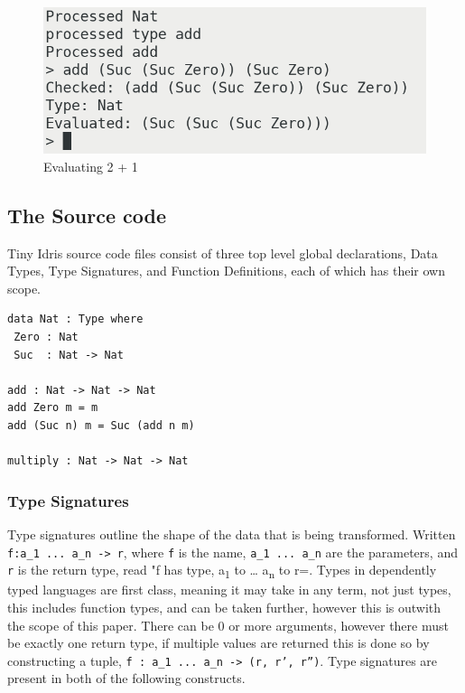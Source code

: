 \documentclass[a4paper]{article}
\begin{document}
\begin{center}
\begin{figure}[htbp]
\centering
\includegraphics[scale=0.35]{./Resource/addEval.png}
\caption{Evaluating 2 + 1}
\end{figure}
\end{center}

\subsection{The Source code}
\label{sec:org61b1be2}
Tiny Idris source code files consist of three top level global 
declarations, Data Types, Type Signatures, and Function Definitions,
each of which has their own scope. 

\begin{center}
\begin{verbatim}
data Nat : Type where
 Zero : Nat
 Suc  : Nat -> Nat

add : Nat -> Nat -> Nat
add Zero m = m
add (Suc n) m = Suc (add n m) 

multiply : Nat -> Nat -> Nat
\end{verbatim}
\end{center}

\subsubsection{Type Signatures}
\label{sec:org63270a0}
Type signatures outline the shape of the data that is being transformed.
Written \texttt{f:a\_1 ... a\_n -> r}, where \texttt{f} is the name, \texttt{a\_1 ...  a\_n} are
the parameters, and \texttt{r} is the return type, read "f has type, a\textsubscript{1} 
to \ldots{} a\textsubscript{n} to r=. Types in dependently typed languages are first class,
meaning it may take in any term, not just types, this includes function
types, and can be taken further, however this is outwith the scope of
this paper. There can be 0 or more arguments,
however there must be exactly one return type, if multiple values are 
returned this is done so by constructing a tuple,
\texttt{f : a\_1 ... a\_n -> (r, r', r'')}. Type signatures are present in both
of the following constructs.
\end{document}
